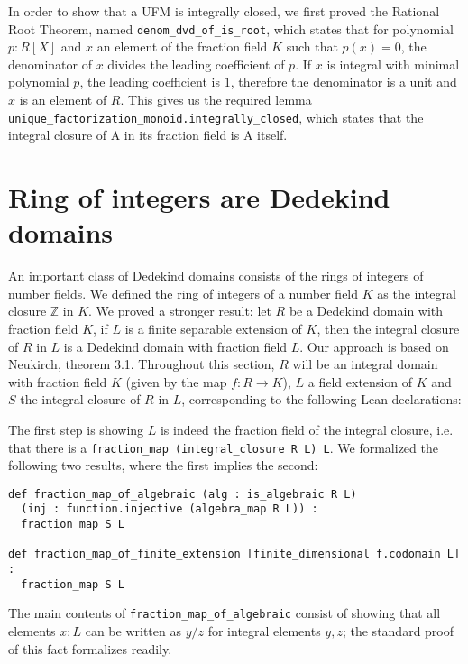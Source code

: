 \documentclass[a4paper,USenglish,cleveref, autoref, thm-restate]{lipics-v2021}
\newcommand{\lean}[1]{\texttt{#1}\xspace} %
\newcommand{\mathlib}{\textsf{mathlib}\xspace}
\newcommand{\Z}{\mathbb{Z}}
\begin{document}
In order to show that a UFM is integrally closed, we first proved the Rational Root Theorem, named \lean{denom\_dvd\_of\_is\_root},
which states that for polynomial $p : R[X]$ and $x$ an element of the fraction field $K$ such that $p(x) = 0$, the denominator of $x$ divides the leading coefficient of $p$.
If $x$ is integral with minimal polynomial $p$, the leading coefficient is $1$, therefore the denominator is a unit and $x$ is an element of $R$.
This gives us the required lemma \lean{unique\_factorization\_monoid.integrally\_closed}, which states that the integral closure of A in its fraction field is A itself.

\section{Ring of integers are Dedekind domains} \label{sec:integral-closure}

An important class of Dedekind domains consists of the rings of integers of number fields.
We defined the ring of integers of a number field $K$ as the integral closure $\Z$ in $K$.
We proved a stronger result: let $R$ be a Dedekind domain with fraction field $K$, if $L$ is a finite separable extension of $K$, then the integral closure of $R$ in $L$ is a Dedekind domain with fraction field $L$.
Our approach is based on Neukirch, theorem 3.1. %
Throughout this section, $R$ will be an integral domain with fraction field $K$ (given by the map $f : R \to K$), $L$ a field extension of $K$ and $S$ the integral closure of $R$ in $L$,
corresponding to the following Lean declarations:

The first step is showing $L$ is indeed the fraction field of the integral closure,
i.e. that there is a \lean{fraction\_map (integral\_closure R L) L}.
We formalized the following two results, where the first implies the second:
\begin{lstlisting}
def fraction_map_of_algebraic (alg : is_algebraic R L)
  (inj : function.injective (algebra_map R L)) :
  fraction_map S L

def fraction_map_of_finite_extension [finite_dimensional f.codomain L] :
  fraction_map S L
\end{lstlisting}
The main contents of \lean{fraction\_map\_of\_algebraic} consist of showing that all elements $x : L$ can be written as $y / z$ for integral elements $y, z$;
the standard proof of this fact formalizes readily. %
\end{document}

